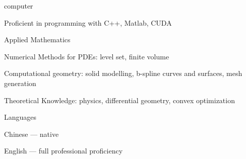 
\begin{cvskills}
  \cvskill
    {computer} %
    {
      \begin{cvitems} %
        \item {Proficient in programming with C++, Matlab, CUDA}
      \end{cvitems}
    } %

    \cvskill
    {Applied Mathematics} %
    {
      \begin{cvitems} %
        \item {Numerical Methods for PDEs: level set, finite volume}
        \item {Computational geometry: solid modelling, b-spline curves and surfaces, mesh generation}
        \item {Theoretical Knowledge: physics, differential geometry, convex optimization}
      \end{cvitems}
    } %
    
  \cvskill
    {Languages} %
    {
      \begin{cvitems} %
        \item {Chinese --- native}
        \item {English --- full professional proficiency}
      \end{cvitems}
    } %
\end{cvskills}

